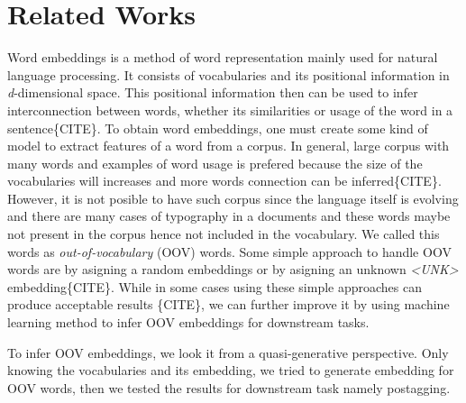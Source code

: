 \chapter{Related Works}
\label{chap:related}

Word embeddings is a method of word representation mainly used for natural
language processing. It consists of vocabularies and its positional information
in \textit{d}-dimensional space. This positional information then can be used to
infer interconnection between words, whether its similarities or usage of the
word in a sentence\{CITE\}. To obtain word embeddings, one must create some kind of
model to extract features of a word from a corpus. In general, large corpus with
many words and examples of word usage is prefered because the size of the
vocabularies will increases and more words connection can be inferred\{CITE\}. However,
it is not posible to have such corpus since the language itself is evolving and
there are many cases of typography in a documents and these words maybe not
present in the corpus hence not included in the vocabulary. We called this words
as \textit{out-of-vocabulary} (OOV) words. Some simple approach to handle OOV
words are by asigning a random embeddings or by asigning an unknown
\textit{\textless UNK\textgreater} embedding\{CITE\}. While in some cases using these
simple approaches can produce acceptable results \{CITE\}, we can further
improve it by using machine learning method to infer OOV embeddings for
downstream tasks.

To infer OOV embeddings, we look it from a quasi-generative perspective. Only
knowing the vocabularies and its embedding, we tried to generate embedding for
OOV words, then we tested the results for downstream task namely postagging.